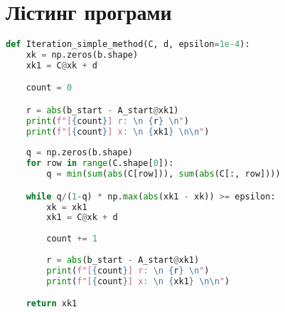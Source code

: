 \documentclass{article}
\begin{document}
    \section{Лістинг програми}
    \begin{lstlisting}[language=Python, caption=Simple Iteration Method]
def Iteration_simple_method(C, d, epsilon=1e-4):
    xk = np.zeros(b.shape)
    xk1 = C@xk + d

    count = 0

    r = abs(b_start - A_start@xk1)
    print(f"[{count}] r: \n {r} \n")
    print(f"[{count}] x: \n {xk1} \n\n")
    
    q = np.zeros(b.shape)
    for row in range(C.shape[0]):
        q = min(sum(abs(C[row])), sum(abs(C[:, row])))

    while q/(1-q) * np.max(abs(xk1 - xk)) >= epsilon:
        xk = xk1
        xk1 = C@xk + d
    
        count += 1
    
        r = abs(b_start - A_start@xk1)
        print(f"[{count}] r: \n {r} \n")
        print(f"[{count}] x: \n {xk1} \n\n")

    return xk1
    \end{lstlisting}
\end{document}
